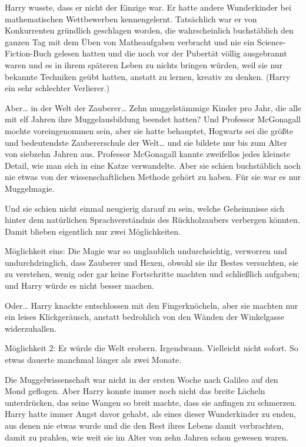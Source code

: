 {Harry wusste, dass er nicht der Einzige war. Er hatte andere Wunderkinder bei mathematischen Wettbewerben kennengelernt. Tatsächlich war er von Konkurrenten gründlich geschlagen worden, die wahrscheinlich buchstäblich den ganzen Tag mit dem Üben von Matheaufgaben verbracht und nie ein Science-Fiction-Buch gelesen hatten und die noch vor der Pubertät völlig ausgebrannt waren und es in ihrem späteren Leben zu nichts bringen würden, weil sie nur bekannte Techniken geübt hatten, anstatt zu lernen, kreativ zu denken. (Harry ein sehr schlechter Verlierer.)

Aber… in der Welt der Zauberer… Zehn muggelstämmige Kinder pro Jahr, die alle mit elf Jahren ihre Muggelausbildung beendet hatten? Und Professor McGonagall mochte voreingenommen sein, aber sie hatte behauptet, Hogwarts sei die größte und bedeutendste Zaubererschule der Welt… und sie bildete nur bis zum Alter von siebzehn Jahren aus. Professor McGonagall kannte zweifellos jedes kleinste Detail, wie man sich in eine Katze verwandelte. Aber sie schien buchstäblich noch nie etwas von der wissenschaftlichen Methode gehört zu haben. Für sie war es nur Muggelmagie.

Und sie schien nicht einmal neugierig darauf zu sein, welche Geheimnisse sich hinter dem natürlichen Sprachverständnis des Rückholzaubers verbergen könnten. Damit blieben eigentlich nur zwei Möglichkeiten.

Möglichkeit eins: Die Magie war so unglaublich undurchsichtig, verworren und undurchdringlich, dass Zauberer und Hexen, obwohl sie ihr Bestes versuchten, sie zu verstehen, wenig oder gar keine Fortschritte machten und schließlich aufgaben; und Harry würde es nicht besser machen.

Oder… Harry knackte entschlossen mit den Fingerknöcheln, aber sie machten nur ein leises Klickgeräusch, anstatt bedrohlich von den Wänden der Winkelgasse widerzuhallen.

Möglichkeit 2: Er würde die Welt erobern. Irgendwann. Vielleicht nicht sofort. So etwas dauerte manchmal länger als zwei Monate.

Die Muggelwissenschaft war nicht in der ersten Woche nach Galileo auf den Mond geflogen. Aber Harry konnte immer noch nicht das breite Lächeln unterdrücken, das seine Wangen so breit machte, dass sie anfingen zu schmerzen. Harry hatte immer Angst davor gehabt, als eines dieser Wunderkinder zu enden, aus denen nie etwas wurde und die den Rest ihres Lebens damit verbrachten, damit zu prahlen, wie weit sie im Alter von zehn Jahren schon gewesen waren.

}
